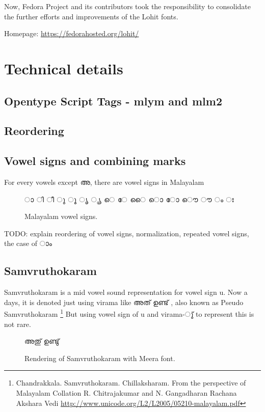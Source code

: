 Now, Fedora Project and its contributors took the responsibility to consolidate
the further efforts and improvements of the Lohit fonts.

Homepage: {\url{https://fedorahosted.org/lohit/}}

\section{Technical details}
\subsection {Opentype Script Tags - mlym and mlm2}
\subsection {Reordering}
\subsection {Vowel signs and combining marks}

For every vowels except {\malayalam അ}, there are vowel signs in Malayalam 

\begin{figure}[h]
  {\meera\textexample ‌ാ ി ീ ു ൂ ൃ ൄ െ േ ൈ ൊ ോ ൌ ൗ ം ഃ }\\
  \caption{Malayalam vowel signs.}
\end{figure}

TODO: explain reordering of vowel signs, normalization, repeated vowel signs, the case of {\malayalam ാം }

\subsection {Samvruthokaram}

Samvruthokaram is a mid vowel sound representation for vowel sign u. Now a 
days, 
it is denoted just using virama like {\malayalam അത് ഉണ്ട് }, also known as 
Pseudo Samvruthokaram
\footnote{Chandrakkala. Samvruthokaram. Chillaksharam.
From the perspective of Malayalam Collation
R. Chitrajakumar and N. Gangadharan
Rachana Akshara Vedi \url{http://www.unicode.org/L2/L2005/05210-malayalam.pdf}}
But using vowel sign of u and virama-{\malayalam ു്} to represent this is not 
rare.

\begin{figure}[h]
  \centering
  {\meera\textexample  അതു് ഉണ്ടു് }\\
  \caption{Rendering of Samvruthokaram with Meera font.}
\end{figure}

